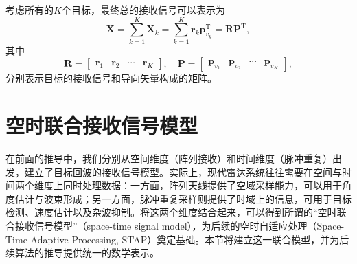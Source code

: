 考虑所有的\( K \)个目标，最终总的接收信号可以表示为
\[
    \mathbf{X} = \sum_{k=1}^{K} \mathbf{X}_k = \sum_{k=1}^{K} \bm{r}_k \bm{p}_{v_k}^{\mathrm{T}} = \mathbf{R} \mathbf{P}^{\mathrm{T}},
\]
其中
\[
    \mathbf{R} = \begin{bmatrix}
        \bm{r}_1 & \bm{r}_2 & \cdots & \bm{r}_K
    \end{bmatrix}, \quad \mathbf{P} = \begin{bmatrix}
        \bm{p}_{v_1} & \bm{p}_{v_2} & \cdots & \bm{p}_{v_K}
    \end{bmatrix},
\]
分别表示目标的接收信号和导向矢量构成的矩阵。

\section{空时联合接收信号模型}

在前面的推导中，我们分别从空间维度（阵列接收）和时间维度（脉冲重复）出发，建立了目标回波的接收信号模型。实际上，现代雷达系统往往需要在空间与时间两个维度上同时处理数据：一方面，阵列天线提供了空域采样能力，可以用于角度估计与波束形成；另一方面，脉冲重复采样则提供了时域上的信息，可用于目标检测、速度估计以及杂波抑制。将这两个维度结合起来，可以得到所谓的``空时联合接收信号模型''（space-time signal model），为后续的空时自适应处理（Space-Time Adaptive Processing, STAP）奠定基础。本节将建立这一联合模型，并为后续算法的推导提供统一的数学表示。

